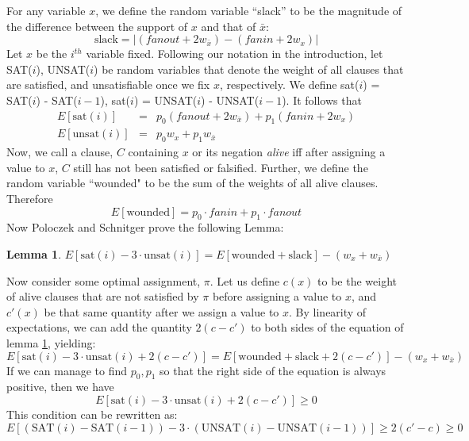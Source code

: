 \documentclass[11pt,letter]{article}
\newtheorem{lemma}{Lemma}
\begin{document}
For any variable $x$, we define the random variable ``slack'' to be the magnitude of the difference between the support of $x$ and that of $\bar{x}$:
\begin{equation}
\text{slack} = |(fanout + 2w_{\bar{x}}) -(fanin + 2w_x)|
\end{equation}
Let $x$ be the $i^{th}$ variable fixed. Following our notation in the introduction, let SAT($i$), UNSAT($i$) be random variables that denote the weight of all clauses that are satisfied, and unsatisfiable once we fix $x$, respectively. We define sat($i$) = SAT($i$) - SAT($i-1$), sat($i$) = UNSAT($i$) - UNSAT($i-1$). It follows that
\begin{eqnarray}
E[\text{sat}(i)] &=& p_0(fanout + 2w_{\bar{x}}) + p_1(fanin + 2w_{x})\\
E[\text{unsat}(i)] &=& p_0w_x + p_1w_{\bar{x}}
\end{eqnarray}
Now, we call a clause, $C$ containing $x$ or its negation \textit{alive} iff after assigning a value to $x$, $C$ still has not been satisfied or falsified. Further, we define the random variable ``wounded" to be the sum of the weights of all alive clauses. Therefore
\begin{equation}
E[\text{wounded}] = p_0 \cdot fanin + p_1 \cdot fanout
\end{equation}
Now Poloczek and Schnitger prove the following Lemma:
\begin{lemma} \label{L:2}
$E[\text{sat}(i) - 3\cdot\text{unsat}(i)] = E[\text{wounded} + \text{slack}] - (w_x + w_{\bar{x}})$
\end{lemma}
Now consider some optimal assignment, $\pi$. Let us define $c(x)$ to be the weight of alive clauses that are not satisfied by $\pi$ before assigning a value to $x$, and $c'(x)$ be that same quantity after we assign a value to $x$. By linearity of expectations, we can add the quantity $2(c-c')$ to both sides of the equation of lemma \ref{L:2}, yielding:
\begin{equation}
E[\text{sat}(i) - 3\cdot\text{unsat}(i)+ 2(c-c')] = E[\text{wounded} + \text{slack} + 2(c-c')] - (w_x + w_{\bar{x}})
\end{equation}
If we can manage to find $p_0,p_1$ so that the right side of the equation is always positive, then we have
\begin{equation}
E[\text{sat}(i) - 3\cdot\text{unsat}(i)+ 2(c-c')] \ge 0 \label{C:1}
\end{equation}
This condition can be rewritten as:
\begin{equation}
E[(\text{SAT}(i) - \text{SAT}(i-1)) - 3\cdot(\text{UNSAT}(i) - \text{UNSAT}(i-1))] \ge  2(c'-c) \ge 0
\end{equation}
\end{document}
